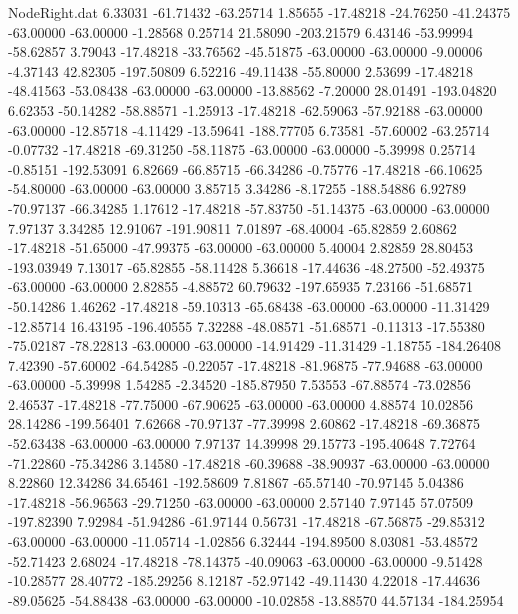 \begin{filecontents}{NodeRight.dat}
   6.33031  -61.71432  -63.25714     1.85655  -17.48218  -24.76250  -41.24375  -63.00000  -63.00000   -1.28568    0.25714   21.58090 -203.21579
   6.43146  -53.99994  -58.62857     3.79043  -17.48218  -33.76562  -45.51875  -63.00000  -63.00000   -9.00006   -4.37143   42.82305 -197.50809
   6.52216  -49.11438  -55.80000     2.53699  -17.48218  -48.41563  -53.08438  -63.00000  -63.00000  -13.88562   -7.20000   28.01491 -193.04820
   6.62353  -50.14282  -58.88571    -1.25913  -17.48218  -62.59063  -57.92188  -63.00000  -63.00000  -12.85718   -4.11429  -13.59641 -188.77705
   6.73581  -57.60002  -63.25714    -0.07732  -17.48218  -69.31250  -58.11875  -63.00000  -63.00000   -5.39998    0.25714   -0.85151 -192.53091
   6.82669  -66.85715  -66.34286    -0.75776  -17.48218  -66.10625  -54.80000  -63.00000  -63.00000    3.85715    3.34286   -8.17255 -188.54886
   6.92789  -70.97137  -66.34285     1.17612  -17.48218  -57.83750  -51.14375  -63.00000  -63.00000    7.97137    3.34285   12.91067 -191.90811
   7.01897  -68.40004  -65.82859     2.60862  -17.48218  -51.65000  -47.99375  -63.00000  -63.00000    5.40004    2.82859   28.80453 -193.03949
   7.13017  -65.82855  -58.11428     5.36618  -17.44636  -48.27500  -52.49375  -63.00000  -63.00000    2.82855   -4.88572   60.79632 -197.65935
   7.23166  -51.68571  -50.14286     1.46262  -17.48218  -59.10313  -65.68438  -63.00000  -63.00000  -11.31429  -12.85714   16.43195 -196.40555
   7.32288  -48.08571  -51.68571    -0.11313  -17.55380  -75.02187  -78.22813  -63.00000  -63.00000  -14.91429  -11.31429   -1.18755 -184.26408
   7.42390  -57.60002  -64.54285    -0.22057  -17.48218  -81.96875  -77.94688  -63.00000  -63.00000   -5.39998    1.54285   -2.34520 -185.87950
   7.53553  -67.88574  -73.02856     2.46537  -17.48218  -77.75000  -67.90625  -63.00000  -63.00000    4.88574   10.02856   28.14286 -199.56401
   7.62668  -70.97137  -77.39998     2.60862  -17.48218  -69.36875  -52.63438  -63.00000  -63.00000    7.97137   14.39998   29.15773 -195.40648
   7.72764  -71.22860  -75.34286     3.14580  -17.48218  -60.39688  -38.90937  -63.00000  -63.00000    8.22860   12.34286   34.65461 -192.58609
   7.81867  -65.57140  -70.97145     5.04386  -17.48218  -56.96563  -29.71250  -63.00000  -63.00000    2.57140    7.97145   57.07509 -197.82390
   7.92984  -51.94286  -61.97144     0.56731  -17.48218  -67.56875  -29.85312  -63.00000  -63.00000  -11.05714   -1.02856    6.32444 -194.89500
   8.03081  -53.48572  -52.71423     2.68024  -17.48218  -78.14375  -40.09063  -63.00000  -63.00000   -9.51428  -10.28577   28.40772 -185.29256
   8.12187  -52.97142  -49.11430     4.22018  -17.44636  -89.05625  -54.88438  -63.00000  -63.00000  -10.02858  -13.88570   44.57134 -184.25954

\end{filecontents}
